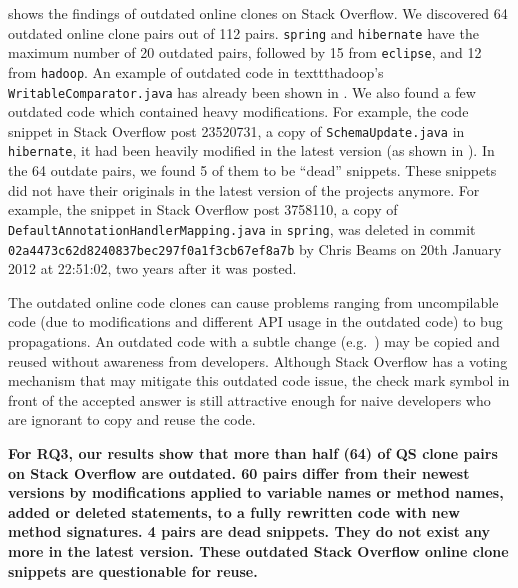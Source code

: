 \documentclass[sigconf,review, anonymous]{acmart}
\begin{document}
 shows the findings of outdated online clones on Stack Overflow. We discovered 64 outdated online clone pairs out of 112 pairs. {\small{\texttt{spring}}} and {\small{\texttt{hibernate}}} have the maximum number of 20 outdated pairs, followed by 15 from {\small{\texttt{eclipse}}}, and 12 from {\small{\texttt{hadoop}}}. An example of outdated code in {\small{texttt{hadoop}}}'s {\small{\texttt{WritableComparator.java}}} has already been shown in . We also found a few outdated code which contained heavy modifications. For example, the code snippet in Stack Overflow post 23520731, a copy of {\small{\texttt{SchemaUpdate.java}}} in {\small{\texttt{hibernate}}}, it had been heavily modified in the latest version (as shown in ). In the 64 outdate pairs, we found 5 of them to be ``dead'' snippets. These snippets did not have their originals in the latest version of the projects anymore. For example, the snippet in Stack Overflow post 3758110, a copy of {\small{\texttt{DefaultAnnotationHandlerMapping.java}}} in {\small{\texttt{spring}}}, was deleted in commit {\small{\texttt{02a4473c62d8240837bec297f0a1f3cb67ef8a7b}}} by Chris Beams on 20th January 2012 at 22:51:02, two years after it was posted. %

The outdated online code clones can cause problems ranging from uncompilable code (due to modifications and different API usage in the outdated code) to bug propagations. An outdated code with a subtle change (e.g.~) may be copied and reused without awareness from developers. Although Stack Overflow has a voting mechanism that may mitigate this outdated code issue, the check mark symbol in front of the accepted answer is still attractive enough for naive developers who are ignorant to copy and reuse the code.

\textbf{For RQ3, our results show that more than half (64) of QS clone pairs on Stack Overflow are outdated. 60 pairs differ from their newest versions by modifications applied to variable names or method names, added or deleted statements, to a fully rewritten code with new method signatures. 4 pairs are dead snippets. They do not exist any more in the latest version. These outdated Stack Overflow online clone snippets are questionable for reuse.} %
\end{document}
